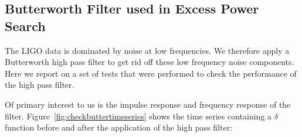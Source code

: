 \documentclass{article}
\begin{document}
\subsection{Butterworth Filter used in Excess Power Search}
\label{section:Butterworth}


The LIGO data is dominated by noise at low frequencies. We 
therefore apply a Butterworth high pass filter to get rid off these 
low frequency noise components. Here we report on a set of tests 
that were performed to check the performance of the high pass filter.

Of primary interest to us is the impulse response and frequency response 
of the filter. Figure~\ref{fig:checkbuttertimeseries} shows the 
time series containing a $\delta$ function before and after the 
application of the high pass filter:
\begin{figure}
\begin{center}

\end{center}
\end{figure}
\end{document}
